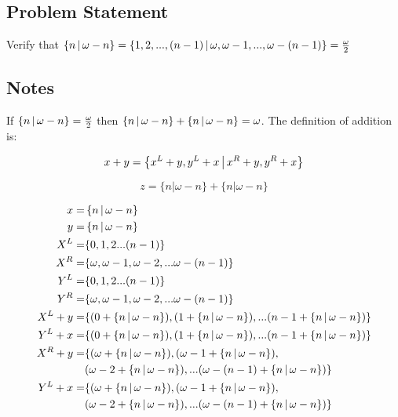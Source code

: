 \subsection*{Problem Statement}

Verify that $\left\{n \,\middle|\, \omega - n\right\}
= \left\{1,2,...,(n - 1) \,\middle|\, \omega, \omega - 1, ..., \omega - (n - 1)\right\}
= \frac{\omega}{2}$

\subsection*{Notes}
If $\left\{n \,\middle|\, \omega - n\right\} = \frac{\omega}{2}$ then $\left\{n \,\middle|\, \omega - n\right\} + \left\{n \,\middle|\, \omega - n\right\}=\omega$.  The definition of addition is:

\begin{equation*}
    x + y = \left\{x^L + y, y^L + x \,\middle|\, x^R + y, y^R + x\right\}
\end{equation*}

\begin{equation*}
    z = \{n|\omega - n\} + \{n|\omega - n\}
\end{equation*}

\begin{align*}
    x = & \left\{n \,\middle|\, \omega - n\right\} \\
    y = & \left\{n \,\middle|\, \omega - n\right\} \\
    X^L = & \{ 0, 1, 2 ... (n - 1) \} \\
    X^R = & \{ \omega, \omega - 1, \omega - 2, ... \omega - (n - 1) \}\\
    Y^L = & \{ 0, 1, 2 ... (n - 1) \} \\
    Y^R = & \{ \omega, \omega - 1, \omega - 2, ... \omega - (n - 1) \} \\
    X^L + y = & \{ (0 + \left\{n \,\middle|\, \omega - n\right\}), (1 + \left\{n \,\middle|\, \omega - n\right\}), ... (n - 1 + \left\{n \,\middle|\, \omega - n\right\}) \} \\
    Y^L + x = & \{ (0 + \left\{n \,\middle|\, \omega - n\right\}), (1 + \left\{n \,\middle|\, \omega - n\right\}), ... (n - 1 + \left\{n \,\middle|\, \omega - n\right\}) \} \\
    X^R + y = & \{ (\omega + \left\{n \,\middle|\, \omega - n\right\}), (\omega - 1 + \left\{n \,\middle|\, \omega - n\right\}), \\ & (\omega - 2 + \left\{n \,\middle|\, \omega - n\right\}), ... (\omega - (n - 1) + \left\{n \,\middle|\, \omega - n\right\}) \} \\
    Y^L + x = & \{ (\omega + \left\{n \,\middle|\, \omega - n\right\}), (\omega - 1 + \left\{n \,\middle|\, \omega - n\right\}), \\ & (\omega - 2 + \left\{n \,\middle|\, \omega - n\right\}), ... (\omega - (n - 1) + \left\{n \,\middle|\, \omega - n\right\}) \}
\end{align*}

